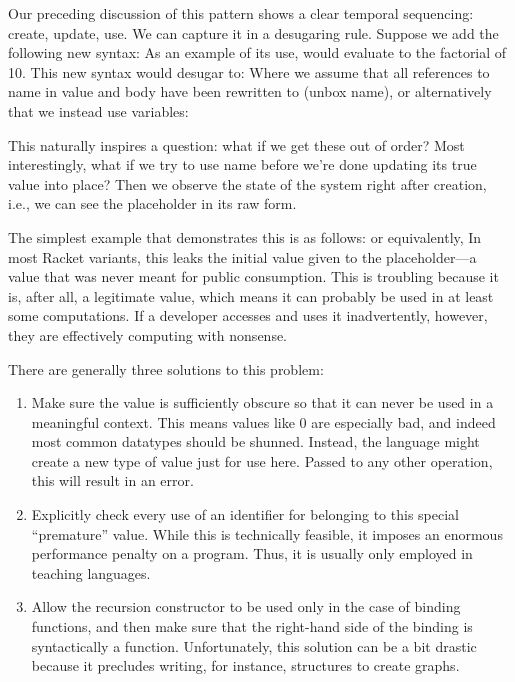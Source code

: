 
Our preceding discussion of this pattern shows a clear temporal sequencing:
create, update, use. We can capture it in a desugaring rule. Suppose we add the
following new syntax:
As an example of its use,
would evaluate to the factorial of 10. This new syntax would desugar to:
Where we assume that all references to name in value and body have been
rewritten to (unbox name), or alternatively that we instead use variables:

This naturally inspires a question: what if we get these out of order? Most
interestingly, what if we try to use name before we’re done updating its true
value into place? Then we observe the state of the system right after creation,
i.e., we can see the placeholder in its raw form.

The simplest example that demonstrates this is as follows:
or equivalently,
In most Racket variants, this leaks the initial value given to the placeholder—a
value that was never meant for public consumption. This is troubling because it
is, after all, a legitimate value, which means it can probably be used in at
least some computations. If a developer accesses and uses it inadvertently,
however, they are effectively computing with nonsense.

There are generally three solutions to this problem:
\begin{enumerate}
  \item 
Make sure the value is sufficiently obscure so that it can never be used in a
meaningful context. This means values like 0 are especially bad, and indeed
most common datatypes should be shunned. Instead, the language might create
a new type of value just for use here. Passed to any other operation, this will
result in an error.
  \item 
Explicitly check every use of an identifier for belonging to this special “premature”
value. While this is technically feasible, it imposes an enormous performance
penalty on a program. Thus, it is usually only employed in teaching
languages.
  \item 
Allow the recursion constructor to be used only in the case of binding functions,
and then make sure that the right-hand side of the binding is syntactically a function.
Unfortunately, this solution can be a bit drastic because it precludes writing,
for instance, structures to create graphs.
\end{enumerate}
